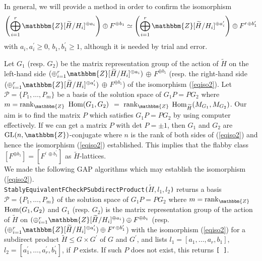 \documentclass{amsart}
\theoremstyle{plain}
\theoremstyle{definition}
\theoremstyle{remark}
\newcommand{\bZ}{\mathbbm{Z}}\newcommand{\bQ}{\mathbbm{Q}}
\newcommand{\GL}{{\rm GL}}\newcommand{\SL}{{\rm SL}}
\newcounter{sub}\def\tr{\mbox{tr }}
\begin{document}

In general, we will provide a method 
in order to confirm the isomorphism 
\begin{align}
\left(\bigoplus_{i=1}^r \bZ[\widetilde{H}/H_i]^{\oplus a_i}\right)\oplus F^{\oplus b_1}
\simeq
\left(\bigoplus_{i=1}^r \bZ[\widetilde{H}/H_i]^{\oplus a_i^{\prime}}\right)\oplus F^{\prime\,\oplus b_1^{\prime}}
\label{eqiso2}
\end{align} 
with $a_i,a_i^{\prime}\geq 0$, $b_1,b_1^\prime\geq 1$, 
although it is needed by trial and error. 

Let 
$G_1$ (resp. $G_2$) be 
the matrix representation group of the action of $\widetilde{H}$ 
on the left-hand side 
$(\oplus_{i=1}^r \bZ[\widetilde{H}/H_i]^{\oplus a_i})$ $\oplus$ 
$F^{\oplus b_1}$ 
(resp. the right-hand side 
$(\oplus_{i=1}^r \bZ[\widetilde{H}/H_i]^{\oplus a_i^{\prime}})$ $\oplus$ 
$F^{\oplus b_1^{\prime}}$) of the isomorphism (\ref{eqiso2}). 
Let $\mathcal{P}=\{P_1,\dots,P_m\}$ be a basis of the solution space 
of $G_1P=PG_2$ where $m={\rm rank}_\bZ$ ${\rm Hom}(G_1,G_2)$ $=$ 
${\rm rank}_\bZ$ ${\rm Hom}_{\widetilde{H}}(M_{G_1},M_{G_2})$. 
Our aim is to find the matrix $P$ which satisfies $G_1 P=P G_2$ 
by using computer effectively.
If we can get a matrix $P$ with det $P=\pm 1$, then 
$G_1$ and $G_2$ are $\GL(n,\bZ)$-conjugate where 
$n$ is the rank of both sides of (\ref{eqiso2}) 
and hence the isomorphism (\ref{eqiso2}) established. 
This implies that the flabby class $[F^{\oplus b_1}]=[F^{\prime\,\oplus b_1^{\prime}}]$ as $\widetilde{H}$-lattices.\\

We made the following GAP \cite{GAP} algorithms 
which may establish the isomorphism  (\ref{eqiso2}).\\

\noindent
{\tt StablyEquivalentFCheckPSubdirectProduct($\widetilde{H},l_1,l_2$)} returns 
a basis $\mathcal{P}=\{P_1,\dots,P_m\}$ 
of the solution space of $G_1P=PG_2$ 
where $m={\rm rank}_\bZ$ ${\rm Hom}(G_1,G_2)$ and 
$G_1$ (resp. $G_2$) is the matrix representation group of the action of 
$\widetilde{H}$ 
on $(\oplus_{i=1}^r \bZ[\widetilde{H}/H_i]^{\oplus a_i})\oplus F^{\oplus b_1}$ (resp. 
$(\oplus_{i=1}^r \bZ[\widetilde{H}/H_i]^{\oplus a_i^{\prime}})\oplus F^{\prime\,\oplus b_1^{\prime}}$) 
with the isomorphism (\ref{eqiso2}) 
for a subdirect product 
$\widetilde{H}\leq G\times G^\prime$ of $G$ and $G^\prime$, 
and 
lists $l_1=[a_1,\ldots,a_r,b_1]$, 
$l_2=[a_1^{\prime},\ldots,a_r^{\prime},b_1^{\prime}]$, if $P$ exists. 
If such $P$ does not exist, this returns {\tt [ ]}.\\
\end{document}
